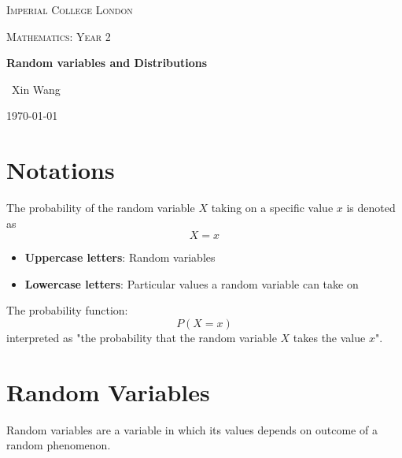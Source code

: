 \documentclass[10pt,a4paper]{article}
\begin{document}
\begin{titlepage}
	\centering
	{\scshape\LARGE Imperial College London \par}
	\vspace{1cm}
	{\scshape\Large Mathematics: Year 2\par}
	\vspace{1.5cm}
	{\huge\bfseries Random variables and Distributions \par}
	\vspace{2cm}
	{\Large\ Xin Wang }
	\vfill
	{\large \today\par}
\end{titlepage}

\begin{abstract}
    A probability distribution is the mathematical function that gives the probabilities of
    occurrence \textbf{of all the different possible outcomes for an experiment}. This is similar to
   a graph giving a visual picture of the function i.e. it is a visual mathematical
    description of a random phenomenon in terms of its sample space and the probabilities of events.
\end{abstract}

\tableofcontents
\pagebreak

\section{Notations}

The probability of the random variable $X$ taking on a specific value $x$ is denoted as $$X = x$$
\begin{itemize}
    \item \textbf{Uppercase letters}: Random variables
    \item \textbf{Lowercase letters}: Particular values a random variable can take on
\end{itemize}

The probability function:
$$
    P(X=x)
$$
interpreted as "the probability that the random variable $X$ takes the value $x$".
\section{Random Variables}

Random variables are a variable in which its values depends on outcome of a random phenomenon.
\end{document}
